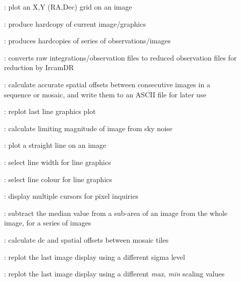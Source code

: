 \begin{description}
\item []: plot an X,Y (RA,Dec) grid on an image

\item []: produce hardcopy of current
image/graphics

\item []: produces hardcopies of series of
observations/images

\item []: converts raw integrations/observation
files to reduced observation files for reduction by {\sc IrcamDR}

\item []: calculate accurate spatial offsets
between consecutive images in a sequence or mosaic, and write them to
an ASCII file for later use

\item []: replot last line graphics plot

\item []: calculate limiting magnitude of image
from sky noise

\item []: plot a straight line on an image

\item []: select line width for line graphics

\item []: select line colour for line graphics

\item []: display multiple cursors for pixel
inquiries

\item []: subtract the median value from a
sub-area of an image from the whole image, for a series of images

\item []: calculate dc and spatial offsets
between mosaic tiles

\item []: replot the last {\bf
{}} image display using a different sigma level

\item []: replot the last {\bf
{}} image display using a different {\it max},{\it
min} scaling values


\end{description}

